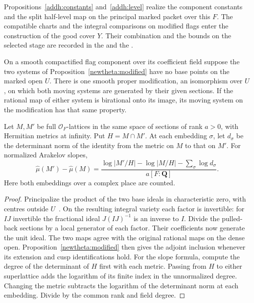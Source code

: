 Propositions~\ref{addh:constants} and~\ref{addh:level} realize the
component constants and the split half-level map on the principal
marked packet over this \(F\). The compatible charts and the integral
comparisons on modified flags enter the construction of the good cover \(Y\).
Their combination and the bounds on the selected stage are recorded
in the 
and the .

\begin{lemma}
\label{zetageo:lattice}
On a smooth compactified flag component over its coefficient field
suppose the two systems of Proposition~\ref{newtheta:modified} have
no base points on the marked open \(U\). There is one smooth proper
modification, an isomorphism over \(U\), on which both moving systems
are generated by their given sections. If the rational map of either
system is birational onto its image, its moving system on the
modification has that same property.

Let \(M,M'\) be full \(\mathcal O_F\)-lattices in the same space of
sections of rank \(a>0\), with Hermitian metrics at infinity. Put
\(H=M\cap M'\). At each embedding \(\sigma\), let \(d_\sigma\)
be the determinant norm of the identity from the metric on \(M\)
to that on \(M'\). For normalized Arakelov slopes,
\[
 \widehat\mu(M')-\widehat\mu(M)
 =\frac{\log|M'/H|-\log|M/H|-\sum_\sigma\log d_\sigma}
        {a[F:\mathbf Q]} .
\]
Here both embeddings over a complex place are counted.
\end{lemma}
\begin{proof}
Principalize the product of the two base ideals in characteristic
zero, with centres outside \(U\)~\cite{wlodarczyk}. On the resulting
integral variety each factor is invertible: for \(IJ\) invertible
the fractional ideal \(J(IJ)^{-1}\) is an inverse to \(I\).
Divide the pulled-back sections by a local generator of each
factor. Their coefficients now generate the unit ideal. The two
maps agree with the original rational maps on the dense open.
Proposition~\ref{newtheta:modified} then gives the adjoint
inclusion whenever its extension and cusp identifications hold.
For the slope formula, compute the degree of the determinant
of \(H\) first with each metric. Passing from \(H\) to either
superlattice adds the logarithm of its finite index in the
unnormalized degree. Changing the metric subtracts the logarithm
of the determinant norm at each embedding. Divide by the common
rank and field degree.
\end{proof}

